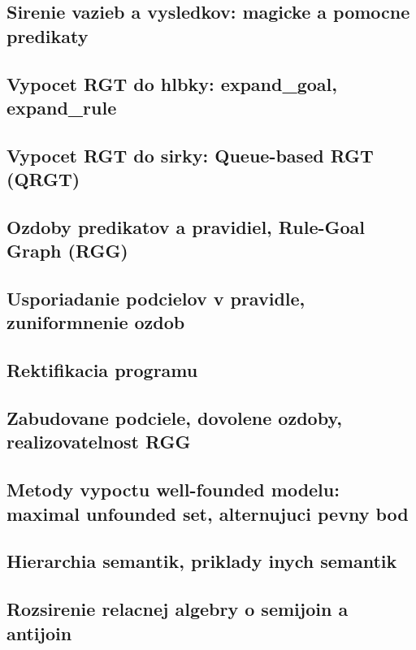 \documentclass[12pt,a4paper]{article}
\begin{document}
\subsection{Sirenie vazieb a vysledkov: magicke a pomocne predikaty}

\subsection{Vypocet RGT do hlbky: expand_goal, expand_rule}

\subsection{Vypocet RGT do sirky: Queue-based RGT (QRGT)}

\subsection{Ozdoby predikatov a pravidiel, Rule-Goal Graph (RGG)}

\subsection{Usporiadanie podcielov v pravidle, zuniformnenie ozdob}

\subsection{Rektifikacia programu}

\subsection{Zabudovane podciele, dovolene ozdoby, realizovatelnost RGG}

\subsection{Metody vypoctu well-founded modelu: maximal unfounded set, alternujuci pevny bod}

\subsection{Hierarchia semantik, priklady inych semantik}

\subsection{Rozsirenie relacnej algebry o semijoin a antijoin}
\end{document}
